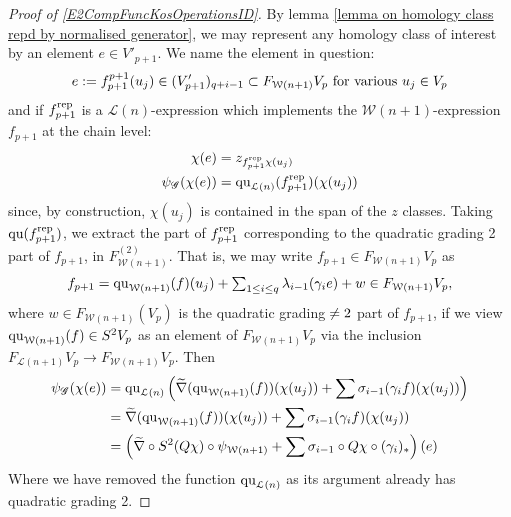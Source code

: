 \documentclass[11pt]{amsart}
\theoremstyle{plain}
\theoremstyle{definition}
\renewcommand{\to}{\longrightarrow}
\newcommand{\scrG}{\mathscr{G}}
\newcommand{\calW}{\mathcal{W}}
\newcommand{\calL}{\mathcal{L}}
\theoremstyle{plain}
\newcommand{\BSW}{{\scrG}}
\newcommand{\quadratic}{\textup{qu}}
\begin{document}
\begin{Composite functor spectral sequences}
\begin{tricky proofs of operation compatibilities}
\begin{proof}[Proof of \ref{E2CompFuncKosOperationsID}]
By lemma \ref{lemma on homology class repd by normalised generator}, we may represent any homology class of interest by an element $e\in V'_{p+1}$. We name the element in question:
\[e:=f^{p+1}_{p+1}(u_j)\in (V'_{p+1})_{q+i-1}\subset F_{\calW(n+1)}V_p\textup{ for various }u_j\in V_{p}\]
and if $f_{p+1}^\textup{rep}$ is a $\calL(n)$-expression which implements the $\calW(n+1)$-expression $f_{p+1}$ at the chain level:
\begin{alignat*}{2}
\chi(e)&=z_{f_{p+1}^\textup{rep}\chi(u_j)}\\
\psi_{\BSW}(\chi(e))&=\quadratic_{\calL(n)}(f_{p+1}^\textup{rep})(\chi(u_j))
\end{alignat*}
since, by construction, $\chi(u_j)$ is contained in the span of the $z$ classes.  Taking $\quadratic(f_{p+1}^\textup{rep})$, we extract the part of $f_{p+1}^\textup{rep}$ corresponding to the quadratic grading 2 part of $f_{p+1}$, in $F_{\calW(n+1)}^{(2)}$. That is, we may write $f_{p+1}\in F_{\calW(n+1)}V_p$ as
\[f_{p+1}=\quadratic_{\calW(n+1)}(f)(u_j)+\textstyle\sum_{1\leq i\leq q} \lambda_{i-1}(\gamma_ie) + w\in F_{\calW(n+1)}V_p,\]
where $w\in F_{\calW(n+1)}(V_p)$ is the quadratic grading$\makebox[0cm][l]{}\neq2$ part of $f_{p+1}$, if we view $\quadratic_{\calW(n+1)}(f)\in S^2V_p$ as an element of $F_{\calW(n+1)}V_p$ via the inclusion $F_{\calL(n+1)}V_p\to F_{\calW(n+1)}V_p$. Then
\begin{alignat*}{2}
\psi_\BSW(\chi(e))&=\quadratic_{\calL(n)} \left(\widetilde{\nabla}(\quadratic_{\calW(n+1)}(f))(\chi(u_j))+\sum \sigma_{i-1}(\gamma_if)(\chi(u_j))\right)\\
&=\widetilde{\nabla}(\quadratic_{\calW(n+1)}(f))(\chi(u_j))+\sum \sigma_{i-1}(\gamma_if)(\chi(u_j))\\
&=\left(\widetilde{\nabla}\circ S^2(Q\chi)\circ \psi_{\calW(n+1)}+\sum\sigma_{i-1}\circ Q\chi\circ(\gamma_i)_*\right)(e)
\end{alignat*}
Where we have removed the function $\quadratic_{\calL(n)}$ as its argument already has quadratic grading 2.
\end{proof}


\end{tricky proofs of operation compatibilities}
\end{Composite functor spectral sequences}
\end{document}
